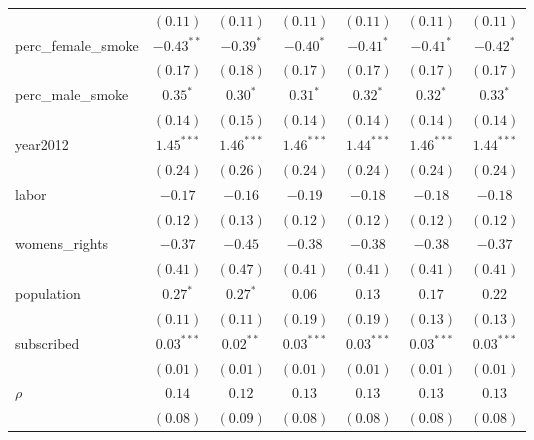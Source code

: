 \begin{table}[!h]
\begin{center}
\begin{tabular}{l c c c c c c }
                        & $(0.11)$     & $(0.11)$     & $(0.11)$     & $(0.11)$     & $(0.11)$     & $(0.11)$     \\
perc\_female\_smoke     & $-0.43^{**}$ & $-0.39^{*}$  & $-0.40^{*}$  & $-0.41^{*}$  & $-0.41^{*}$  & $-0.42^{*}$  \\
                        & $(0.17)$     & $(0.18)$     & $(0.17)$     & $(0.17)$     & $(0.17)$     & $(0.17)$     \\
perc\_male\_smoke       & $0.35^{*}$   & $0.30^{*}$   & $0.31^{*}$   & $0.32^{*}$   & $0.32^{*}$   & $0.33^{*}$   \\
                        & $(0.14)$     & $(0.15)$     & $(0.14)$     & $(0.14)$     & $(0.14)$     & $(0.14)$     \\
year2012                & $1.45^{***}$ & $1.46^{***}$ & $1.46^{***}$ & $1.44^{***}$ & $1.46^{***}$ & $1.44^{***}$ \\
                        & $(0.24)$     & $(0.26)$     & $(0.24)$     & $(0.24)$     & $(0.24)$     & $(0.24)$     \\
labor                   & $-0.17$      & $-0.16$      & $-0.19$      & $-0.18$      & $-0.18$      & $-0.18$      \\
                        & $(0.12)$     & $(0.13)$     & $(0.12)$     & $(0.12)$     & $(0.12)$     & $(0.12)$     \\
womens\_rights          & $-0.37$      & $-0.45$      & $-0.38$      & $-0.38$      & $-0.38$      & $-0.37$      \\
                        & $(0.41)$     & $(0.47)$     & $(0.41)$     & $(0.41)$     & $(0.41)$     & $(0.41)$     \\
population              & $0.27^{*}$   & $0.27^{*}$   & $0.06$       & $0.13$       & $0.17$       & $0.22$       \\
                        & $(0.11)$     & $(0.11)$     & $(0.19)$     & $(0.19)$     & $(0.13)$     & $(0.13)$     \\
subscribed              & $0.03^{***}$ & $0.02^{**}$  & $0.03^{***}$ & $0.03^{***}$ & $0.03^{***}$ & $0.03^{***}$ \\
                        & $(0.01)$     & $(0.01)$     & $(0.01)$     & $(0.01)$     & $(0.01)$     & $(0.01)$     \\
$\rho$                  & $0.14$       & $0.12$       & $0.13$       & $0.13$       & $0.13$       & $0.13$       \\
                        & $(0.08)$     & $(0.09)$     & $(0.08)$     & $(0.08)$     & $(0.08)$     & $(0.08)$     \\

\end{tabular}
\end{center}
\end{table}
